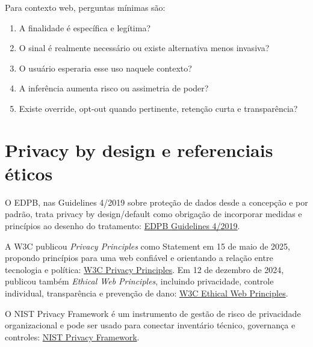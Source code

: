 \documentclass[11pt,a4paper]{article}
\begin{document}
Para contexto web, perguntas mínimas são:
\begin{enumerate}
\item A finalidade é específica e legítima?
\item O sinal é realmente necessário ou existe alternativa menos invasiva?
\item O usuário esperaria esse uso naquele contexto?
\item A inferência aumenta risco ou assimetria de poder?
\item Existe override, opt-out quando pertinente, retenção curta e transparência?
\end{enumerate}

\section{Privacy by design e referenciais éticos}
O EDPB, nas Guidelines 4/2019 sobre proteção de dados desde a concepção e por padrão, trata privacy by design/default como obrigação de incorporar medidas e princípios ao desenho do tratamento: \href{https://www.edpb.europa.eu/documents/guideline/guidelines-42019-on-article-25-data-protection-by-design-and-by-default_en}{EDPB Guidelines 4/2019}.

A W3C publicou \emph{Privacy Principles} como Statement em 15 de maio de 2025, propondo princípios para uma web confiável e orientando a relação entre tecnologia e política: \href{https://www.w3.org/TR/privacy-principles/}{W3C Privacy Principles}. Em 12 de dezembro de 2024, publicou também \emph{Ethical Web Principles}, incluindo privacidade, controle individual, transparência e prevenção de dano: \href{https://www.w3.org/TR/ethical-web-principles/}{W3C Ethical Web Principles}.

O NIST Privacy Framework é um instrumento de gestão de risco de privacidade organizacional e pode ser usado para conectar inventário técnico, governança e controles: \href{https://www.nist.gov/privacy-framework}{NIST Privacy Framework}.
\end{document}
